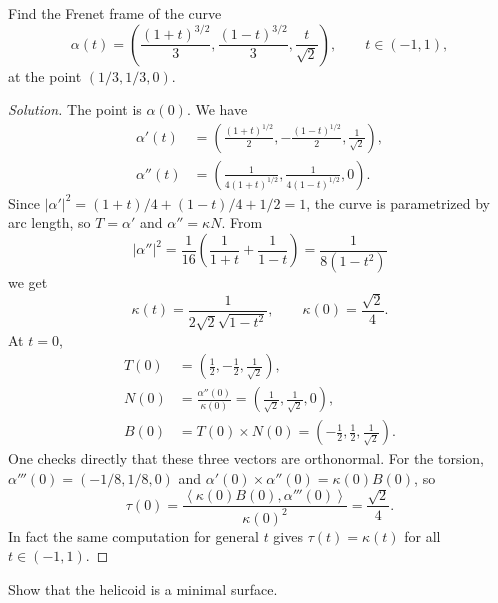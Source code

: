 \begin{exercise}
\label{exercise-garcia-frenet-frame}
Find the Frenet frame of the curve
$$
\alpha(t) =
\left(
\frac{(1+t)^{3/2}}{3},
\frac{(1-t)^{3/2}}{3},
\frac{t}{\sqrt{2}}
\right),
\qquad t \in (-1,1),
$$
at the point $(1/3, 1/3, 0)$.
\end{exercise}

\begin{proof}[Solution]
The point is $\alpha(0)$. We have
$$
\begin{aligned}
\alpha'(t) &=
\left(
\frac{(1+t)^{1/2}}{2},
-\frac{(1-t)^{1/2}}{2},
\frac{1}{\sqrt{2}}
\right), \\
\alpha''(t) &=
\left(
\frac{1}{4(1+t)^{1/2}},
\frac{1}{4(1-t)^{1/2}},
0
\right).
\end{aligned}
$$
Since
$|\alpha'|^2 = (1+t)/4 + (1-t)/4 + 1/2 = 1$,
the curve is parametrized by arc length, so
$T = \alpha'$ and $\alpha'' = \kappa N$.
From
$$
|\alpha''|^2 =
\frac{1}{16}
\left(\frac{1}{1+t} + \frac{1}{1-t}\right)
= \frac{1}{8(1-t^2)}
$$
we get
$$
\kappa(t) = \frac{1}{2\sqrt{2}\sqrt{1-t^2}},
\qquad
\kappa(0) = \frac{\sqrt{2}}{4}.
$$
At $t = 0$,
$$
\begin{aligned}
T(0) &=
\left(\frac{1}{2}, -\frac{1}{2},
\frac{1}{\sqrt{2}}\right), \\
N(0) &= \frac{\alpha''(0)}{\kappa(0)} =
\left(\frac{1}{\sqrt{2}},
\frac{1}{\sqrt{2}}, 0\right), \\
B(0) &= T(0) \times N(0) =
\left(-\frac{1}{2}, \frac{1}{2},
\frac{1}{\sqrt{2}}\right).
\end{aligned}
$$
One checks directly that these three
vectors are orthonormal. For the torsion,
$\alpha'''(0) = (-1/8, 1/8, 0)$ and
$\alpha'(0) \times \alpha''(0) =
\kappa(0) B(0)$, so
$$
\tau(0) =
\frac{\left\langle{} \kappa(0) B(0),
\alpha'''(0) \right\rangle{}}
{\kappa(0)^2}
= \frac{\sqrt{2}}{4}.
$$
In fact the same computation for general
$t$ gives $\tau(t) = \kappa(t)$ for all
$t \in (-1,1)$.
\end{proof}

\begin{exercise}
\label{exercise-garcia-helicoid-minimal}
Show that the helicoid is a minimal
surface.
\end{exercise}

